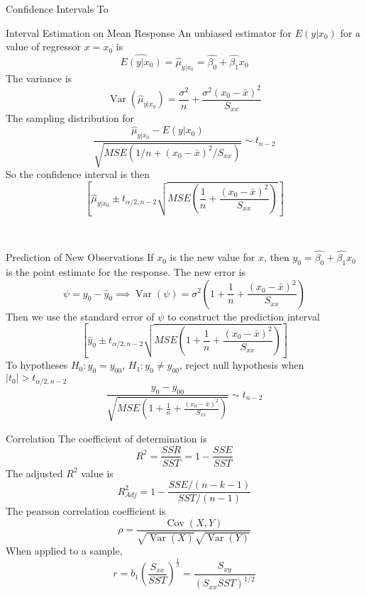 \documentclass{article}
\DeclareMathOperator{\Var}{Var}
\DeclareMathOperator{\Cov}{Cov}
\begin{document}
\begin{multicols*}{3}
\begin{blackbox}{Confidence Intervals}
        To 
        \begin{brownbox}{Interval Estimation on Mean Response}
            An unbiased estimator for $E(y|x_0)$ for a value of regressor $x=x_0$ is 
            \[\widehat{E(y|x_0)} = \hat{\mu}_{y|x_0} = \hat{\beta_0} + \hat{\beta_1}x_0\]
            The variance is \\[-1.2ex]
            \[\Var(\hat{\mu}_{y|x_0}) = \frac{\sigma^2}{n} + \frac{\sigma^2(x_0-\bar{x})^2}{S_{xx}}\]
            The sampling distribution for 
            \[\frac{\hat{\mu}_{y|x_0} - E(y|x_0)}{\sqrt{MSE(1/n + (x_0-\bar{x})^2/S_{xx})}} \sim t_{n-2}\]
            So the confidence interval is then 
            \[\left[\hat{\mu}_{y|x_0} \pm t_{\alpha/2, n-2}\sqrt{MSE\left(\frac{1}{n} + \frac{(x_0 - \bar{x})^2}{S_{xx}}\right)} \right]\]
        \end{brownbox}\\[-2ex]
    \end{blackbox}
    \begin{blackbox}{Prediction of New Observations}
        If $x_0$ is the new value for $x$, then $\hat{y}_0 = \hat{\beta_0} + \hat{\beta_1}x_0$ is the point estimate for the response. The new error is \\[-4ex]
        \[\psi = y_0 - \hat{y}_0 \implies \Var(\psi) = \sigma^2\left(1+\frac{1}{n} + \frac{(x_0-\bar{x})^2}{S_{xx}}\right)\]
        Then we use the standard error of $\psi$ to construct the prediction interval 
        \[\left[\hat{y}_0 \pm t_{\alpha/2, n-2} \sqrt{MSE\left(1+\frac{1}{n} + \frac{(x_0-\bar{x})^2}{S_{xx}}\right)}\right]\]
        To hypotheses $H_0: y_0 = y_{00}$, $H_1: y_0 \neq y_{00}$, reject null hypothesis when $|t_0| > t_{\alpha/2, n-2}$
        \[\frac{y_0 - y_{00}}{\sqrt{MSE\left(1+\frac{1}{n} + \frac{(x_0-\bar{x})^2}{S_{xx}}\right)}} \sim  t_{n-2}\]
    \end{blackbox}
    \begin{blackbox}{Correlation}
        The coefficient of determination is \\[-2ex]
        \[R^2 = \frac{SSR}{SST} = 1 - \frac{SSE}{SST}\]
        The adjusted $R^2$ value is \\[-2ex]
        \[R^2_{Adj} = 1 - \frac{SSE/(n-k-1)}{SST/(n-1)}\]
        The pearson correlation coefficient is \\[-2ex]
        \[\rho = \frac{\Cov(X,Y)}{\sqrt{\Var(X)}\sqrt{\Var(Y)}}\]
        When applied to a sample, \\[-3ex]
        \[
            r = b_1\left(\frac{S_{xx}}{SST}\right)^{\frac{1}{2}} = \frac{S_{xy}}{(S_{xx}SST)^{1/2}}  
\]
\end{blackbox}
\end{multicols*}
\end{document}
